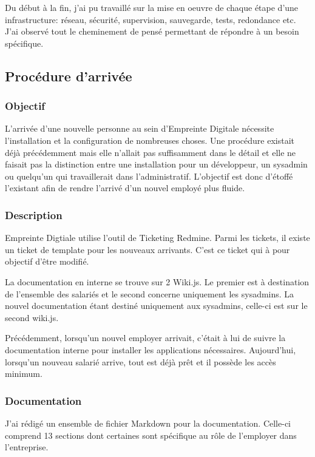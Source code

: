 \documentclass[12pt]{article}
\begin{document}
Du début à la fin, j'ai pu travaillé sur la mise en oeuvre de chaque étape d'une infrastructure: réseau, sécurité, supervision, sauvegarde, tests, redondance etc.
J'ai observé tout le cheminement de pensé permettant de répondre à un besoin spécifique.



\newpage
\subsection{Procédure d'arrivée}
\subsubsection{Objectif}
L'arrivée d'une nouvelle personne au sein d'Empreinte Digitale nécessite l'installation et la configuration de nombreuses choses.
Une procédure existait déjà précédemment mais elle n'allait pas suffisamment dans le détail et elle ne faisait pas la distinction entre une installation pour un développeur, un sysadmin ou quelqu'un qui travaillerait dans l'administratif.
L'objectif est donc d'étoffé l'existant afin de rendre l'arrivé d'un nouvel employé plus fluide.

\subsubsection{Description}
Empreinte Digtiale utilise l'outil de Ticketing Redmine.
Parmi les tickets, il existe un ticket de template pour les nouveaux arrivants.
C'est ce ticket qui à pour objectif d'être modifié.

La documentation en interne se trouve sur 2 Wiki.js.
Le premier est à destination de l'ensemble des salariés et le second concerne uniquement les sysadmins.
La nouvel documentation étant destiné uniquement aux sysadmins, celle-ci est sur le second wiki.js.

Précédemment, lorsqu'un nouvel employer arrivait, c'était à lui de suivre la documentation interne pour installer les applications nécessaires.
Aujourd'hui, lorsqu'un nouveau salarié arrive, tout est déjà prêt et il possède les accès minimum. 

\subsubsection{Documentation}
J'ai rédigé un ensemble de fichier Markdown pour la documentation. 
Celle-ci comprend 13 sections dont certaines sont spécifique au rôle de l'employer dans l'entreprise.
\end{document}
